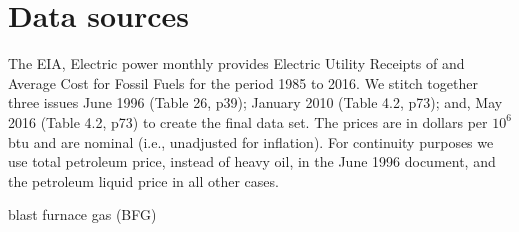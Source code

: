 \documentclass[10pt]{report}
\begin{document}
\section{Data sources}
The EIA, Electric power monthly provides Electric Utility Receipts of and Average Cost for Fossil Fuels for the period 1985 to 2016.
We stitch together three issues June 1996 (Table 26, p39); January 2010 (Table 4.2, p73); and, 
May 2016 (Table 4.2, p73) to create the final data set.
The prices are in dollars per $10^6$ btu and are nominal (i.e., unadjusted for inflation).
For continuity purposes we use total petroleum price, instead of heavy oil, in the June 1996 document, and the petroleum liquid price in all other cases.


blast furnace gas (BFG)
\end{document}

